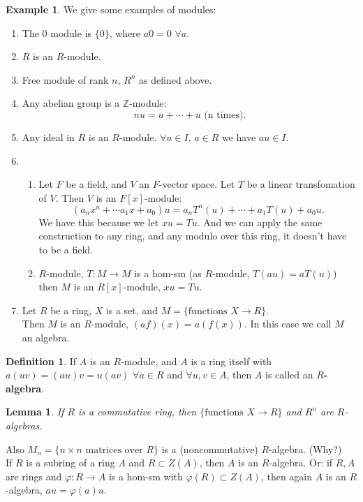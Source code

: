 \documentclass[9pt,reqno,twoside]{amsbook}
\theoremstyle{plain}
\numberwithin{section}{chapter}
\numberwithin{equation}{chapter}
\newtheorem{lem}[theorem]{Lemma}
\theoremstyle{definition}
\newtheorem{Def}[theorem]{Definition}
\newtheorem{Ex}[theorem]{Example}
\theoremstyle{remark}
\theoremstyle{plain}
\renewcommand{\phi}{\varphi}
\begin{document}
\begin{Ex}
We give some examples of modules:
\begin{enumerate}
\item The $0$ module is $\{0\}$, where $a0 = 0$ $\forall a$. 
\item $R$ is an $R$-module. 

\item Free module of rank $n$, $R^n$ as defined above. 
\item Any abelian group is a $\mathbb{Z}$-module:
$$
nu = u + \cdots + u\text{ (n times)}. 
$$
\item Any ideal in $R$ is an $R$-module. $\forall u \in I$, $a \in R$ we have $au \in I$. 

\item 

\begin{enumerate}
\item Let $F$ be a field, and $V$ an $F$-vector space. Let $T$ be a linear transfomation of $V$. Then $V$ is an $F[x]$-module:
$$
(a_nx^n + \cdots a_1x + a_0)u = a_nT^n(u) + \cdots + a_1T(u) + a_0u. 
$$
We have this because we let $xu = Tu$. And we can apply the same construction to any ring, and any modulo over this ring, it doesn't have to be a field. 
\item $R$-module, $T:M \to M$ is a hom-sm (as $R$-module, $T(au) = aT(u)$) then $M$ is an $R[x]$-module, $xu = Tu$. 
\end{enumerate}
\item Let $R$ be a ring, $X$ is a set, and $M = \{\text{functions } X\to R\}$. \\
Then $M$ is an $R$-module, $(af)(x) = a(f(x))$. In this case we call $M$ an algebra. 
\end{enumerate}
\end{Ex}

\begin{Def}
If $A$ is an $R$-module, and $A$ is a ring itself with $a(uv) = (au)v = u(av)$ $\forall a \in R$ and $\forall u,v \in A$, then $A$ is called an $R$\textbf{-algebra}. 
\end{Def}

\begin{lem}
If $R$ is a commutative ring, then $\{\text{functions } X\to R\}$ and $R^n$ are $R$-algebras. 
\end{lem}

Also $M_n = \{n \times n \text{ matrices over } R\}$ is a (noncommutative) $R$-algebra. (Why?)\\
If $R$ is a subring of a ring $A$ and $R \subset Z(A)$, then $A$ is an $R$-algebra. Or: if $R,A$ are rings and $\phi:R \to A$ is a hom-sm with $\phi(R) \subset Z(A)$, then again $A$ is an $R$-algebra, $au = \phi(a)u$. 
\end{document}
